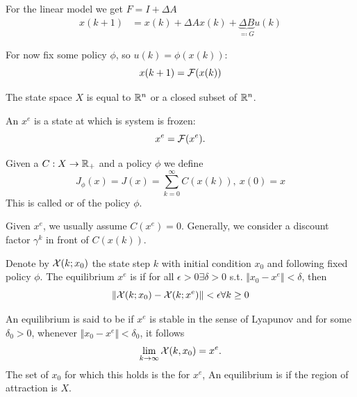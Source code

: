 For the linear model we get 
\(F=I+\Delta A\)
\begin{align*}
    x(k+1) &= x(k)+\Delta Ax(k)+\underbrace{\Delta B}_{\eqqcolon G}u(k)
\end{align*}

For now fix some policy \(\phi\), so \(u(k)=\phi(x(k))\):
\[x(k+1)=\mathcal{F}(x(k))\]
\begin{assumption}\label{ass:1.2}
    The state space \(X\) is equal to \(\mathbb{R}^n\) or a closed subset of \(\mathbb{R}^n\).
\end{assumption}

\begin{definition}\label{def:1.3}
    An  \(x^e\) is a state at which is system is frozen:
    \[x^e=\mathcal{F}(x^e).\]
\end{definition}


\begin{definition}\label{def:1.4}
    Given a  \(C:X\to \mathbb{R}_+\) and a 
    policy \(\phi\) we define 
    \[J_\phi(x)=J(x)=\sum_{k=0}^\infty C(x(k)),\ x(0)=x\] 
    This is called  or  of the policy \(\phi\).
\end{definition}
Given \(x^e\), we usually assume \(C(x^e)=0\). Generally, we consider a discount factor \(\gamma^k\) in front of \(C(x(k))\).

\begin{definition}\label{def:1.5}
    Denote by \(\mathcal{X}(k;x_0)\) the state step \(k\) with initial condition \(x_0\) and following fixed policy \(\phi\).
    The equilibrium \(x^e\) is  if for all 
    \(\epsilon>0\exists \delta>0\) s.t. \(\Vert x_0-x^e\Vert < \delta\), then 
    \[\Vert \mathcal{X}(k;x_0)-\mathcal{X}(k;x^e)\Vert<\epsilon \forall k\geq 0\]
\end{definition}

\begin{definition}\label{def:1.6}
    An equilibrium is said to be  if 
    \(x^e\) is stable in the sense of Lyapunov and for some \(\delta_0>0\),
    whenever \(\Vert x_0-x^e\Vert<\delta_0\), it follows
    \[\lim_{k \to\infty} \mathcal{X}(k,x_0)=x^e.\]
    The set of \(x_0\) for which this holds is the  for 
    \(x^e\), An equilibrium is  if the region of attraction 
    is \(X\). 
\end{definition}

